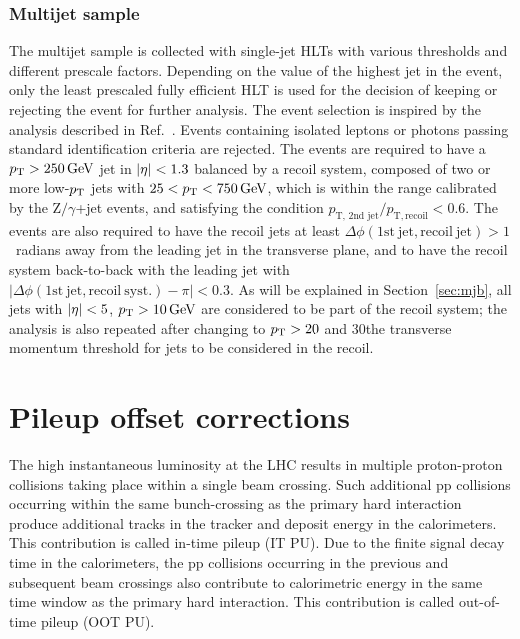 \documentclass[11pt,twoside,a4paper,cmspaper,final,collab]{cms-tdr}
\begin{document}
\subsubsection*{Multijet sample}

The multijet sample is collected with single-jet HLTs with various \pt thresholds and different prescale factors. Depending on the value of the highest jet \pt in the event,  only the least prescaled fully efficient HLT is
used for the decision of keeping or rejecting the event for further analysis.
The event selection is inspired by the analysis described in Ref.~\cite{Aad:2011he}.
Events containing isolated leptons or photons passing standard identification criteria are rejected.
The events are required to have a $p_{\mathrm{T}}>250\,\text{Ge\hspace{-.08em}V}$ jet in $\lvert \eta \rvert<1.3$ balanced by a recoil system, composed of two or more low-$p_{\mathrm{T}}$ jets with $25<p_{\mathrm{T}}<750\,\text{Ge\hspace{-.08em}V}$, which is within the range
calibrated by the Z$/\gamma$+jet events, and satisfying the condition $p_\text{T, 2nd jet}/p_\mathrm{T, recoil}<0.6$.
The events are also required to have the recoil jets at least
$\Delta\phi(\mathrm{1st~jet, recoil~jet})>1$~radians
away from the leading jet in the transverse plane, and to have the recoil system
back-to-back with the leading jet with $|\Delta\phi(\mathrm{1st~jet, recoil~syst.})-\pi|<0.3$.
As will be explained in Section~\ref{sec:mjb}, all jets with $\lvert \eta \rvert<5$, $p_{\mathrm{T}}>10\,\text{Ge\hspace{-.08em}V}$ are considered to be part of the
recoil system; the analysis is also repeated
after changing to $p_{\mathrm{T}}>20$ and 30\GeV the transverse momentum threshold for jets to be considered in the recoil.

\section{Pileup offset corrections}
\label{sec:pileup}\label{Sec:pileup}

The high instantaneous luminosity at the LHC results in multiple proton-proton collisions taking place within a single beam crossing. Such additional pp collisions occurring within the same bunch-crossing as the primary hard interaction produce additional tracks in the tracker and deposit energy in the calorimeters. This contribution is called in-time pileup (IT PU). Due to the finite signal decay time in the calorimeters, the pp collisions occurring in the previous and subsequent beam crossings also contribute to calorimetric energy in the same time window as the primary hard interaction. This contribution is called out-of-time pileup (OOT PU).
\end{document}
